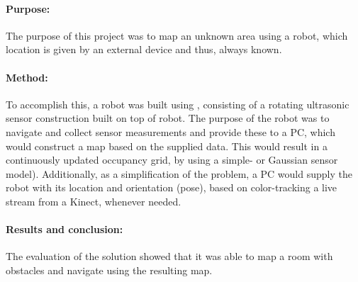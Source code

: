 \paragraph{Purpose:}The purpose of this project was to map an unknown area using a robot, which location is given by an external device and thus, always known.

\paragraph{Method:}To accomplish this, a robot was built using \legoms, consisting of a rotating ultrasonic sensor construction built on top of robot.
The purpose of the robot was to navigate and collect sensor measurements and provide these to a PC, which would construct a map based on the supplied data.
This would result in a continuously updated occupancy grid, by using a simple- or Gaussian sensor model).
Additionally, as a simplification of the problem, a PC would supply the robot with its location and orientation (pose), based on color-tracking a live stream from a Kinect, whenever needed.

\paragraph{Results and conclusion:}
The evaluation of the solution showed that it was able to map a room with obstacles and navigate using the resulting map.
